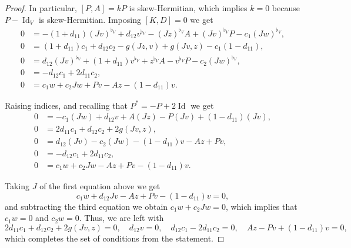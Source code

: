 \documentclass{article}
\theoremstyle{definition}
\DeclareMathOperator{\Id}{Id}
\begin{document}
\begin{proof}
    In particular, $[P,A]=kP$ is skew-Hermitian, which implies $k=0$ because $P-\Id_V$ is skew-Hermitian. Imposing $[K,D]=0$ we get \begin{align*}
        0&=-(1+d_{11})(Jv)^{\flat_V} +d_{12}v^{\flat_V} -(J z)^{\flat_V} A+(J v)^{\flat_V} P -c_1 (Jw)^{\flat_V},\\
        0&=(1+d_{11})c_1 + d_{12}c_2 - g(Jz,v)+g(Jv,z)-c_1(1-d_{11}),\\
        0&=d_{12}(Jv)^{\flat_V} +(1+d_{11})v^{\flat_V} +z^{\flat_V} A-v^{\flat_V} P-c_2 (Jw)^{\flat_V},\\
        0&=-d_{12}c_1 + 2d_{11}c_2,\\
        0&=c_1w+c_2Jw+Pv-Az-(1-d_{11})v.
    \end{align*}

    Raising indices, and recalling that $P^*=-P+2\Id$ we get \begin{align*}
        0&=-c_1 (Jw) +d_{12}v + A(J z)- P(J v)+(1-d_{11})(Jv),\\
        0&=2d_{11}c_1 + d_{12}c_2 +2g(Jv,z),\\
        0&=d_{12}(Jv)-c_2 (Jw) -(1-d_{11})v - Az+ Pv,\\
        0&=-d_{12}c_1 + 2d_{11}c_2,\\
        0&=c_1w+c_2Jw-Az+Pv-(1-d_{11})v.
    \end{align*}

    Taking $J$ of the first equation above we get $$c_1 w +d_{12}Jv - A z+Pv-(1-d_{11})v=0,$$ and subtracting the third equation we obtain $c_1w+c_2Jw=0$, which implies that $c_1w=0$ and $c_2w=0$. Thus, we are left with $$2d_{11}c_1 + d_{12}c_2 +2g(Jv,z)=0, \quad d_{12}v=0, \quad d_{12}c_1-2d_{11}c_2=0, \quad Az-Pv+(1-d_{11})v=0,$$ which completes the set of conditions from the statement.
\end{proof}
\end{document}
